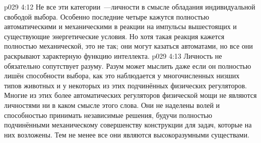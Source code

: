 \vs p029 4:12 \pc Не все эти категории~---личности в смысле обладания индивидуальной свободой выбора. Особенно последние четыре кажутся полностью автоматическими и механическими в реакции на импульсы вышестоящих и существующие энергетические условия. Но хотя такая реакция кажется полностью механической, это не так; они могут казаться автоматами, но все они раскрывают характерную функцию интеллекта.
\vs p029 4:13 Личность не обязательно сопутствует разуму. Разум может мыслить даже если он полностью лишён способности выбора, как это наблюдается у многочисленных низших типов животных и у некоторых из этих подчинённых физических регуляторов. Многие из этих более автоматических регуляторов физической мощи не являются личностями ни в каком смысле этого слова. Они не наделены волей и способностью принимать независимые решения, будучи полностью подчинёнными механическому совершенству конструкции для задач, которые на них возложены. Тем не менее все они являются высокоразумными существами.
